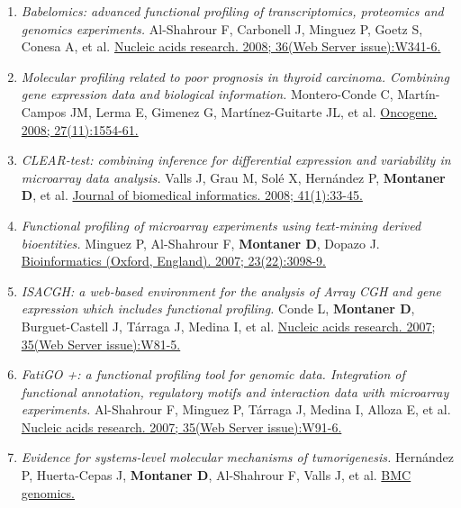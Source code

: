 \begin{enumerate}
{  interpretation.} Tárraga J, Medina I, Carbonell J, Huerta-Cepas J,
  Minguez P, et al.
  \href{http://www.ncbi.nlm.nih.gov//pubmed/18508806}{Nucleic acids
  research. 2008; 36(Web Server issue):W308-14.}
\item
  \emph{Babelomics: advanced functional profiling of transcriptomics,
  proteomics and genomics experiments.} Al-Shahrour F, Carbonell J,
  Minguez P, Goetz S, Conesa A, et al.
  \href{http://www.ncbi.nlm.nih.gov//pubmed/18515841}{Nucleic acids
  research. 2008; 36(Web Server issue):W341-6.}
\item
  \emph{Molecular profiling related to poor prognosis in thyroid
  carcinoma. Combining gene expression data and biological information.}
  Montero-Conde C, Martín-Campos JM, Lerma E, Gimenez G,
  Martínez-Guitarte JL, et al.
  \href{http://www.ncbi.nlm.nih.gov//pubmed/17873908}{Oncogene. 2008;
  27(11):1554-61.}
\item
  \emph{CLEAR-test: combining inference for differential expression and
  variability in microarray data analysis.} Valls J, Grau M, Solé X,
  Hernández P, \textbf{Montaner D}, et al.
  \href{http://www.ncbi.nlm.nih.gov//pubmed/17597009}{Journal of
  biomedical informatics. 2008; 41(1):33-45.}
\item
  \emph{Functional profiling of microarray experiments using text-mining
  derived bioentities.} Minguez P, Al-Shahrour F, \textbf{Montaner D},
  Dopazo J.
  \href{http://www.ncbi.nlm.nih.gov//pubmed/17855415}{Bioinformatics
  (Oxford, England). 2007; 23(22):3098-9.}
\item
  \emph{ISACGH: a web-based environment for the analysis of Array CGH
  and gene expression which includes functional profiling.} Conde L,
  \textbf{Montaner D}, Burguet-Castell J, Tárraga J, Medina I, et al.
  \href{http://www.ncbi.nlm.nih.gov//pubmed/17468499}{Nucleic acids
  research. 2007; 35(Web Server issue):W81-5.}
\item
  \emph{FatiGO +: a functional profiling tool for genomic data.
  Integration of functional annotation, regulatory motifs and
  interaction data with microarray experiments.} Al-Shahrour F, Minguez
  P, Tárraga J, Medina I, Alloza E, et al.
  \href{http://www.ncbi.nlm.nih.gov//pubmed/17478504}{Nucleic acids
  research. 2007; 35(Web Server issue):W91-6.}
\item
  \emph{Evidence for systems-level molecular mechanisms of
  tumorigenesis.} Hernández P, Huerta-Cepas J, \textbf{Montaner D},
  Al-Shahrour F, Valls J, et al.
  \href{http://www.ncbi.nlm.nih.gov//pubmed/17584915}{BMC genomics.
}
\end{enumerate}
